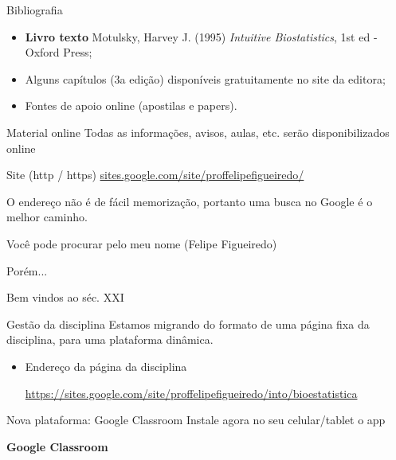 \documentclass{beamer}
\begin{document}
\begin{frame}{Bibliografia}
  \begin{itemize}
  \item {\bf Livro texto} Motulsky, Harvey J. (1995) {\em Intuitive Biostatistics}, 1st ed - Oxford Press;
  \item Alguns capítulos (3a edição) disponíveis gratuitamente no site da editora;
  \item Fontes de apoio online (apostilas e papers).
  \end{itemize}
\end{frame}

\begin{frame}{Material online}
  Todas as informações, avisos, aulas, etc. serão disponibilizados online
  \begin{block}{Site (http / https)}
    \small
    \url{sites.google.com/site/proffelipefigueiredo/}
  \end{block}

  \bigskip
  O endereço não é de fácil memorização, portanto uma busca no Google é o melhor caminho.

  \bigskip
  Você pode procurar pelo meu nome (Felipe Figueiredo)

  \bigskip
  \bigskip
  Porém...
\end{frame}

\begin{frame}{Bem vindos ao séc. XXI}
  \begin{block}{Gestão da disciplina}
    Estamos migrando do formato de uma página fixa da disciplina, para uma plataforma dinâmica.
  \end{block}
  \begin{itemize}
  \item Endereço da página da disciplina

    \url{https://sites.google.com/site/proffelipefigueiredo/into/bioestatistica}
  \end{itemize}
  \begin{block}{Nova plataforma: Google Classroom}
    Instale agora no seu celular/tablet o app

    \bigskip
    {\bf Google Classroom}
  \end{block}
\end{frame}
\end{document}
